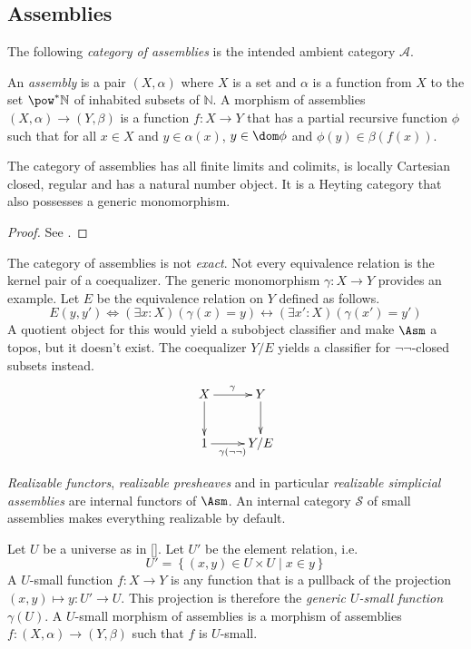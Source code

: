 \documentclass{tac}
\newcommand\cat\mathcal
\newcommand\set[1]{\left\{#1\right\}}
\newcommand\N{\mathbb N}
\newcommand\of{:}
\newcommand\gen\gamma
\newcommand\citep[1]{[\cite{#1}]}
\begin{document}
\subsection{Assemblies}
The following \emph{category of assemblies} is the intended ambient category $\cat A$.

\begin{definition} An \emph{assembly} is a pair $(X,\alpha)$ where $X$ is a set and $\alpha$ is a function from $X$ to the set $\pow^*\N$ of inhabited subsets of $\N$. A morphism of assemblies $(X,\alpha)\to(Y,\beta)$ is a function $f\of X\to Y$ that has a partial recursive function $\phi$ such that for all $x\in X$ and $y\in \alpha(x)$, $y\in\dom\phi$ and $\phi(y)\in \beta(f(x))$.
\end{definition}


\begin{lemma} The category of assemblies has all finite limits and colimits, is locally Cartesian closed, regular and has a natural number object. It is a Heyting category that also possesses a generic monomorphism.
\end{lemma}

\begin{proof} See \cite{MR2479466,MSC:8896618,RealCats}. \end{proof}

\begin{remark} The category of assemblies is not \emph{exact}. Not every equivalence relation is the kernel pair of a coequalizer. The generic monomorphism $\gen\of X\to Y$ provides an example. Let $E$ be the equivalence relation on $Y$ defined as follows.
\[ E(y,y') \iff (\exists x\of X)(\gen(x)=y)\leftrightarrow (\exists x'\of X)(\gen(x')=y') \]
A quotient object for this would yield a subobject classifier and make $\Asm$ a topos, but it doesn't exist. The coequalizer $Y/E$ yields a classifier for $\neg\neg$-closed subsets instead.
\[\xymatrix{
X\ar[r]^\gen\ar[d] & Y\ar[d] \\
1\ar[r]_{\gen(\neg\neg)} & Y/E
}\]
\end{remark}

\emph{Realizable functors}, \emph{realizable presheaves} and in particular \emph{realizable simplicial assemblies} are internal functors of $\Asm$. An internal category $\cat S$ of small assemblies makes everything realizable by default.

\begin{definition} Let $U$ be a universe as in \citep{MR0354798}. Let $U'$ be the element relation, i.e.
\[ U'=\set{(x,y)\in U\times U\middle| x\in y}\]
A $U$-small function $f\of X\to Y$ is any function that is a pullback of the projection $(x,y)\mapsto y\of U'\to U$. This projection is therefore the \emph{generic $U$-small function} $\gen(U)$.
A $U$-small morphism of assemblies is a morphism of assemblies $f\of(X,\alpha)\to(Y,\beta)$ such that $f$ is $U$-small.
\end{definition}
\end{document}
